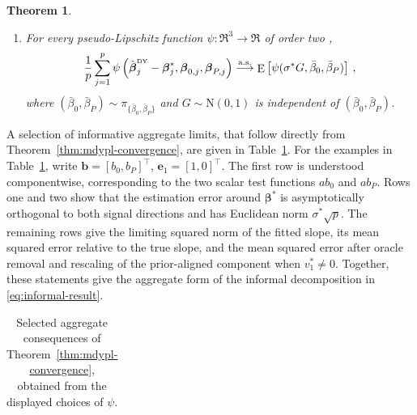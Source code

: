\documentclass{article}
\makeatletter
\DeclareMathOperator{\expect}{E}
\newtheorem{theorem}{Theorem}[section]
\theoremstyle{definition}
\newcommand{\vnorm}[1]{%
	\ensuremath{%
		\if@display
		\left\| #1 \right\|
		\else
		\| #1 \|
		\fi
	}%
}
\newcommand{\abs}[1]{%
	\ensuremath{%
		\if@display
		\left| #1 \right|
		\else
		\lvert #1 \rvert
		\fi
	}%
}
\newcommand*{\bb}{\boldsymbol}
\newcommand{\betady}{\ensuremath{\hat{\bbeta}^{\textrm{\tiny DY}}}}
\def\bx{\bb{x}}
\def\by{\bb{y}}
\def\bbeta{\bb{\beta}}
\makeatother
\begin{document}
\begin{bibunit}
\begin{theorem}
\begin{enumerate}[label=(\roman*)]
        \item For every pseudo-Lipschitz function
        $\psi:\Re^3\to\Re$ of order two
        ,
        \begin{equation}
        \label{eq:test_fun_conc}
            \frac1p
            \sum_{j=1}^p
            \psi
            \left(
                \betady_j-\bbeta_j^*,
                \bbeta_{0,j},
                \bbeta_{P,j}
            \right)
            \overset{\mathrm{a.s.}}{\longrightarrow}
            \expect
            \left[
                \psi(\sigma^*G,\bar\beta_0,\bar\beta_P)
            \right]\,,
        \end{equation}
        where
        $
            (\bar\beta_0,\bar\beta_P)
            \sim
            \pi_{\{\bar\beta_0,\bar\beta_P\}}
        $
        and $G\sim\mathrm N(0,1)$ is independent of
        $(\bar\beta_0,\bar\beta_P)$.
    \end{enumerate}
\end{theorem}
\noindent A selection of informative aggregate limits, that follow directly from
Theorem~\ref{thm:mdypl-convergence}, are given in Table~\ref{tab:estimation-consequences}.
For the examples in Table~\ref{tab:estimation-consequences}, write
$
    \bb b
    =
    [b_0,b_P]^\top$, $\bb e_1
    =
    [1,0]^\top
$.
The first row is understood componentwise, corresponding to the two
scalar test functions $ab_0$ and $ab_P$.
Rows one and two show that the estimation error around $\bbeta^*$ is
asymptotically orthogonal to both signal directions and has Euclidean norm
$\sigma^*\sqrt p$. 
The remaining rows give the limiting squared norm of
the fitted slope, its mean squared error relative to the true slope, and the
mean squared error after oracle removal and rescaling of the prior-aligned
component when $v_1^* \neq 0$. 
Together, these statements give the aggregate form of the informal
decomposition in \eqref{eq:informal-result}.
\begin{table}[ht]
\centering
\caption{Selected aggregate consequences of
Theorem~\ref{thm:mdypl-convergence}, obtained from the displayed choices of
$\psi$.}
\label{tab:estimation-consequences}
\small
\setlength{\tabcolsep}{5pt}
\begin{tabularx}{\textwidth}{
    @{}
    >{\raggedright\arraybackslash}p{}
    >{\raggedright\arraybackslash}X
    >{\raggedright\arraybackslash}p{}
    @{}
}

\end{tabularx}
\end{table}
\end{bibunit}
\end{document}
